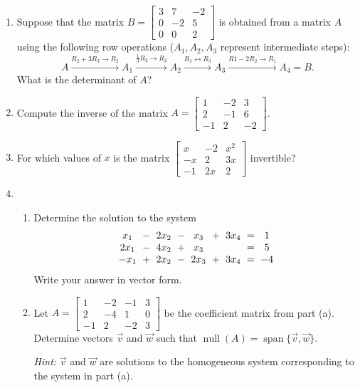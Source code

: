 \documentclass[12pt]{article}
\newcommand{\points}[1]{\marginpar{\hspace{24pt}[#1]}}
\newcommand{\bbm}{\begin{bmatrix}}
\newcommand{\ebm}{\end{bmatrix}}
\begin{document}
\begin{enumerate}
\vspace{4.5in}

\item Suppose that the matrix $B = \bbm 3&7&-2\\0&-2&5\\0&0&2\ebm$ is obtained from a matrix $A$ using the following row operations ($A_1, A_2, A_3$ represent intermediate steps):\points{3} 
\[
 A \xrightarrow{R_2+3R_3\to R_2} A_1 \xrightarrow{\frac{1}{3}R_2\to R_2} A_2 \xrightarrow{R_1\leftrightarrow R_3}A_3 \xrightarrow{R1-2R_2\to R_1} A_4=B.
\]
What is the determinant of $A$?
\newpage

\item Compute the inverse of the matrix $A = \bbm 1&-2&3\\2&-1&6\\-1&2&-2\ebm$.\points{6}

\vspace{5in}

 \item For which values of $x$ is the matrix $\bbm x&-2&x^2\\-x&2&3x\\-1&2x&2\ebm$ invertible? \points{3}


\newpage

\item 
\begin{enumerate}
 \item Determine the solution to the system \points{6}
\[\arraycolsep=3pt
 \begin{array}{ccccccccc}
  x_1&-&2x_2&-&x_3&+&3x_4&=&1\\
  2x_1&-&4x_2&+&x_3& & &=&5\\
  -x_1&+&2x_2&-&2x_3&+&3x_4&=&-4
 \end{array}
\]
 Write your answer in vector form.

\vspace{5in}

 \item Let $A = \bbm 1&-2&-1&3\\2&-4&1&0\\-1&2&-2&3\ebm$ be the coefficient matrix from part (a). Determine vectors $\vec{v}$ and $\vec{w}$ such that $\operatorname{null}(A)=\operatorname{span}\{\vec{v},\vec{w}\}$. \points{2}

\textit{Hint:} $\vec{v}$ and $\vec{w}$ are solutions to the homogeneous system corresponding to the system in part (a).
\end{enumerate}


\end{enumerate}
\end{document}
